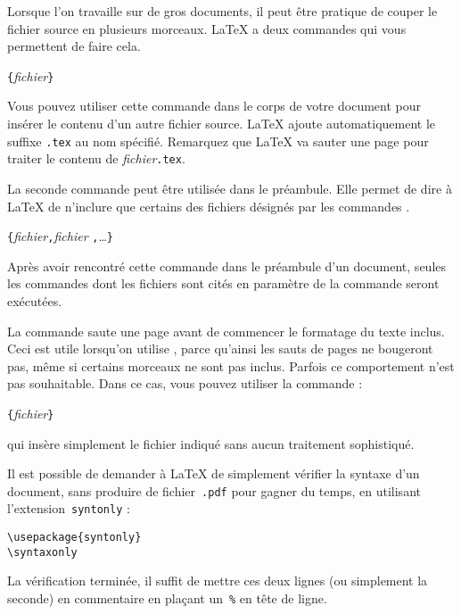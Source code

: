 Lorsque l'on travaille sur de gros documents, il peut être
pratique de couper le fichier source en plusieurs morceaux. \LaTeX{} a
deux commandes qui vous permettent de faire cela.

\begin{lscommand}
\verb|{|\emph{fichier}\verb|}|
\end{lscommand}
Vous pouvez utiliser cette commande dans le corps de votre document
pour insérer le contenu d'un autre fichier source. \LaTeX{} ajoute
automatiquement le suffixe \texttt{.tex} au nom spécifié. Remarquez que
\LaTeX{} va sauter une page pour traiter le contenu de
\emph{fichier}\texttt{.tex}.

La seconde commande peut être utilisée dans le préambule. Elle permet
de dire à \LaTeX{} de n'inclure que certains des fichiers désignés par
les commandes \verb||.
\begin{lscommand}
\verb|{|\emph{fichier}\verb|,|\emph{fichier}%
\verb|,|\ldots\verb|}|
\end{lscommand}
Après avoir rencontré cette commande dans le préambule d'un document,
seules les commandes  dont les fichiers sont cités en
paramètre de la commande  seront exécutées.

La commande  saute une page avant de commencer le
formatage du texte inclus. Ceci est utile lorsqu'on utilise
, parce qu'ainsi les sauts de pages ne bougeront pas,
même si certains morceaux ne sont pas inclus. Parfois ce comportement
n'est pas souhaitable. Dans ce cas, vous pouvez utiliser la commande :
\begin{lscommand}
\verb|{|\emph{fichier}\verb|}|
\end{lscommand}
\noindent qui insère simplement le fichier indiqué sans aucun traitement
sophistiqué.

\enlargethispage{\baselineskip}

Il est possible de demander à \LaTeX{} de simplement vérifier la syntaxe d'un
document, sans produire de fichier~\texttt{.pdf} pour gagner du temps,
en  utilisant l'extension~\texttt{syntonly} :
\begin{verbatim}
\usepackage{syntonly}
\syntaxonly
\end{verbatim}
La vérification terminée, il suffit de mettre ces deux lignes
(ou simplement la seconde) en commentaire en plaçant un~\texttt{\%}
en tête de ligne.


\endinput

%

